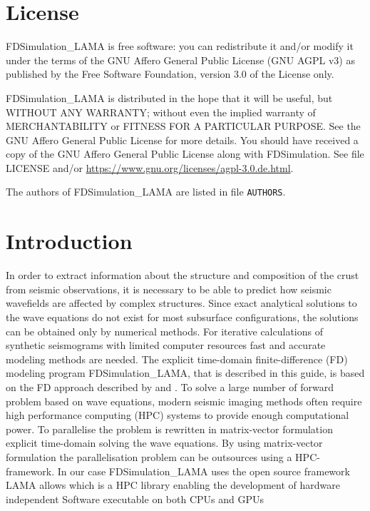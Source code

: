 \documentclass[pdftex,a4paper,parskip,listof=totoc,bibliography=totoc,onehalfspacing,12pt]{scrreprt}
\begin{document}
\setcounter{page}{1}

\cleardoublepage
\chapter*{License}

FDSimulation\_LAMA is free software: you can redistribute it and/or modify it under the terms of the GNU Affero General Public License (GNU AGPL v3) as published by the Free Software Foundation, version 3.0 of the License only.
 
FDSimulation\_LAMA is distributed in the hope that it will be useful, but WITHOUT ANY WARRANTY; without even the implied warranty of MERCHANTABILITY or FITNESS FOR A PARTICULAR PURPOSE. See the GNU Affero General Public License for more details. You should have received a copy of the GNU Affero General Public License along with FDSimulation. See file LICENSE and/or \url{https://www.gnu.org/licenses/agpl-3.0.de.html}.

The authors of FDSimulation\_LAMA are listed in file \lstinline{AUTHORS}.

\cleardoublepage
\chapter*{Introduction}
In order to extract information about the structure and composition of the crust from seismic observations, it is necessary to be able to predict how seismic wavefields are affected by complex structures. 
Since exact analytical solutions to the wave equations do not exist for most subsurface configurations, the solutions can be obtained only by numerical methods. For iterative calculations of synthetic seismograms with limited computer resources fast and accurate modeling methods are needed. 
The explicit time-domain finite-difference (FD) modeling program FDSimulation\_LAMA, that is described in this guide, is based on the FD approach described by \cite{virieux:86} and \cite{levander:88}. 
To solve a large number of forward problem based on wave equations, modern seismic imaging methods often require high performance computing (HPC) systems to provide enough computational power. 
To parallelise the problem is rewritten in matrix-vector formulation explicit time-domain solving the wave equations. 
By using matrix-vector formulation the parallelisation problem can be outsources using a HPC-framework. In our case FDSimulation\_LAMA uses the open source framework LAMA allows which is a HPC library enabling the development of hardware independent Software executable on both CPUs and GPUs
\end{document}
